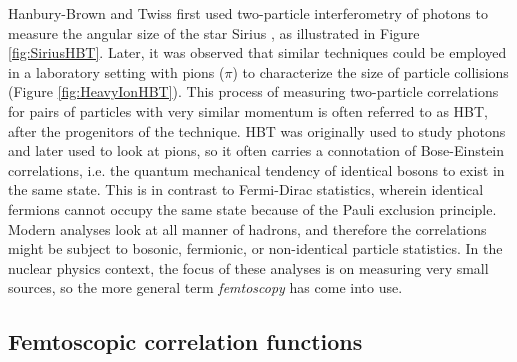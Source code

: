 Hanbury-Brown and Twiss first used two-particle interferometry of photons to measure the angular size of the star Sirius \cite{HanburyBrown:1956bqd}, as illustrated in Figure \ref{fig:SiriusHBT}.
Later, it was observed that similar techniques could be employed in a laboratory setting with pions ($\pi$) to characterize the size of particle collisions \cite{Goldhaber:1960sf} (Figure \ref{fig:HeavyIonHBT}).
This process of measuring two-particle correlations for pairs of particles with very similar momentum is often referred to as HBT, after the progenitors of the technique.
HBT was originally used to study photons and later used to look at pions, so it often carries a connotation of Bose-Einstein correlations, i.e. the quantum mechanical tendency of identical bosons to exist in the same state. This is in contrast to Fermi-Dirac statistics, wherein identical fermions cannot occupy the same state because of the Pauli exclusion principle.
Modern analyses look at all manner of hadrons, and therefore the correlations might be subject to bosonic, fermionic, or non-identical particle statistics.
In the nuclear physics context, the focus of these analyses is on measuring very small sources, so the more general term \textit{femtoscopy} has come into use.


\subsection{Femtoscopic correlation functions}
\label{sec:FemtoscopicCorrelationFunctions}

